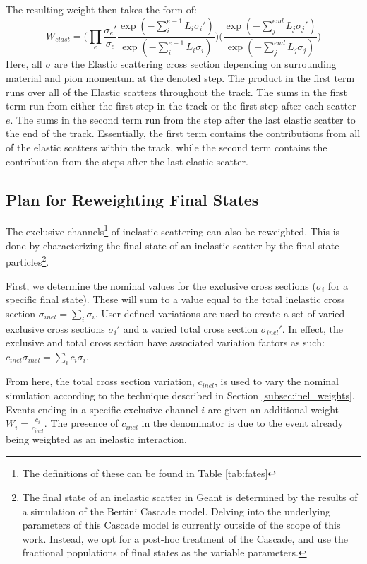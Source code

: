 \documentclass[12pt]{article}
\begin{document}
The resulting weight then takes the form of:
\begin{equation}\label{ref:elastFull}
W_{elast} = \Bigg( \prod \limits_{e} \frac{\sigma_{e}'}{\sigma_{e}} \frac{\exp(-\sum \limits_i^{e-1} L_i  \sigma_{i}')}{\exp(-\sum \limits_i^{e-1} L_i  \sigma_{i})} \Bigg)
\Bigg( \frac{\exp(-\sum \limits_j^{end} L_j \sigma_{j}')} {\exp(-\sum \limits_j^{end} L_j \sigma_{j})} \Bigg)
\end{equation}
Here, all $\sigma$ are the Elastic scattering cross section depending on surrounding material and pion momentum at the denoted step. The product in the first term runs over all of the Elastic scatters throughout the track. The sums in the first term run from either the first step in the track or the first step after each scatter $e$. The sums in the second term run from the step after the last elastic scatter to the end of the track. Essentially, the first term contains the contributions from all of the elastic scatters within the track, while the second term contains the contribution from the steps after the last elastic scatter.

\subsection{Plan for Reweighting Final States}
The exclusive channels\footnote{The definitions of these can be found in Table \ref{tab:fates}} of inelastic scattering can also be reweighted. This is done by characterizing the final state of an inelastic scatter by the final state particles\footnote{The final state of an inelastic scatter in Geant is determined by the results of a simulation of the Bertini Cascade model. Delving into the underlying parameters of this Cascade model is currently outside of the scope of this work. Instead, we opt for a post-hoc treatment of the Cascade, and use the fractional populations of final states as the variable parameters.}. 

First, we determine the nominal values for the exclusive cross sections ($\sigma_{i}$ for a specific final state). These will sum to a value equal to the total inelastic cross section $\sigma_{inel} = \sum\limits_{i}\sigma_{i}$. User-defined variations are used to create a set of varied exclusive cross sections $\sigma_{i}'$ and a varied total cross section $\sigma_{inel}'$. In effect, the exclusive and total cross section have associated variation factors as such: $c_{inel}\sigma_{inel}  = \sum\limits_{i} c_{i} \sigma_{i}$. 

From here, the total cross section variation, $c_{inel}$, is used to vary the nominal simulation according to the technique described in Section \ref{subsec:inel_weights}. Events ending in a specific exclusive channel $i$ are given an additional weight $W_{i} = \frac{c_i}{c_{inel}}$. The presence of $c_{inel}$ in the denominator is due to the event already being weighted as an inelastic interaction. 
\end{document}

